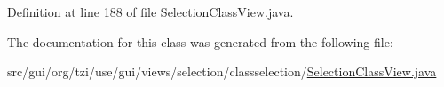 Definition at line 188 of file Selection\-Class\-View.\-java.



The documentation for this class was generated from the following file\-:\begin{DoxyCompactItemize}
\item 
src/gui/org/tzi/use/gui/views/selection/classselection/\hyperlink{_selection_class_view_8java}{Selection\-Class\-View.\-java}\end{DoxyCompactItemize}
